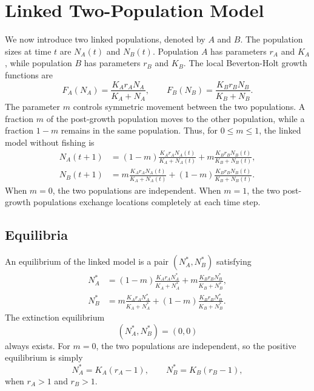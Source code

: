 \documentclass{article}
\numberwithin{equation}{section}
\begin{document}
\section{Linked Two-Population Model}
We now introduce two linked populations, denoted by $A$ and $B$. The
population sizes at time $t$ are $N_A(t)$ and $N_B(t)$. Population $A$
has parameters $r_A$ and $K_A$, while population $B$ has parameters
$r_B$ and $K_B$.
The local Beverton-Holt growth functions are
\begin{equation*}
    F_A(N_A)=\frac{K_A r_A N_A}{K_A+N_A},
    \qquad
    F_B(N_B)=\frac{K_B r_B N_B}{K_B+N_B}.
\end{equation*}
The parameter $m$ controls symmetric movement between the two
populations. A fraction $m$ of the post-growth population moves to the
other population, while a fraction $1-m$ remains in the same population.
Thus, for $0\leq m\leq 1$, the linked model without fishing is
\begin{equation}
    \label{eq:linked-model}
    \begin{aligned}
        N_A(t+1)
            &= (1-m)\frac{K_A r_A N_A(t)}{K_A+N_A(t)}
               + m\frac{K_B r_B N_B(t)}{K_B+N_B(t)},\\
        N_B(t+1)
            &= m\frac{K_A r_A N_A(t)}{K_A+N_A(t)}
               + (1-m)\frac{K_B r_B N_B(t)}{K_B+N_B(t)}.
    \end{aligned}
\end{equation}
When $m=0$, the two populations are independent. When $m=1$, the two
post-growth populations exchange locations completely at each time step.
\subsection{Equilibria}
An equilibrium of the linked model is a pair $(N_A^*,N_B^*)$ satisfying
\begin{equation*}
    \begin{aligned}
        N_A^*
            &= (1-m)\frac{K_A r_A N_A^*}{K_A+N_A^*}
               + m\frac{K_B r_B N_B^*}{K_B+N_B^*},\\
        N_B^*
            &= m\frac{K_A r_A N_A^*}{K_A+N_A^*}
               + (1-m)\frac{K_B r_B N_B^*}{K_B+N_B^*}.
    \end{aligned}
\end{equation*}
The extinction equilibrium
\begin{equation*}
    (N_A^*,N_B^*)=(0,0)
\end{equation*}
always exists.
For $m=0$, the two populations are independent, so the positive
equilibrium is simply
\begin{equation*}
    N_A^*=K_A(r_A-1),
    \qquad
    N_B^*=K_B(r_B-1),
\end{equation*}
when $r_A>1$ and $r_B>1$.
\end{document}
